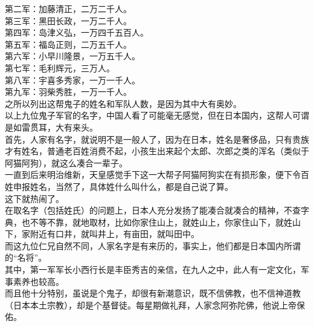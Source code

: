 \begin{multicols}{\theparacolNo}
第二军：加藤清正，二万二千人。\\

第三军：黑田长政，一万二千人。\\

第四军：岛津义弘，一万四千五百人。\\

第五军：福岛正则，二万五千人。\\

第六军：小早川隆景，一万五千人。\\

第七军：毛利辉元，三万人。\\

第八军：宇喜多秀家，一万一千人。\\

第九军：羽柴秀胜，一万一千人。\\

之所以列出这帮鬼子的姓名和军队人数，是因为其中大有奥妙。\\

以上九位鬼子军官的名字，中国人看了可能毫无感觉，但在日本国内，这帮人可谓是如雷贯耳，大有来头。\\

首先，人家有名字，就说明不是一般人了，因为在日本，姓名是奢侈品，只有贵族才有姓名，普通老百姓消费不起，小孩生出来起个太郎、次郎之类的浑名（类似于阿猫阿狗），就这么凑合一辈子。\\

一直到后来明治维新，天皇感觉手下这一大帮子阿猫阿狗实在有损形象，便下令百姓申报姓名，当然了，具体姓什么叫什么，都是自己说了算。\\

这下就热闹了。\\

在取名字（包括姓氏）的问题上，日本人充分发扬了能凑合就凑合的精神，不查字典，也不等不靠，就地取材，比如你家住山上，就姓山上，你家住山下，就姓山下，家附近有口井，就叫井上，有亩田，就叫田中。\\

而这九位仁兄自然不同，人家名字是有来历的，事实上，他们都是日本国内所谓的“名将”。\\

其中，第一军军长小西行长是丰臣秀吉的亲信，在九人之中，此人有一定文化，军事素养也较高。\\

而且他十分特别，虽说是个鬼子，却很有新潮意识，既不信佛教，也不信神道教（日本本土宗教），却是个基督徒。每星期做礼拜，人家念阿弥陀佛，他说上帝保佑。\\


\end{multicols}
